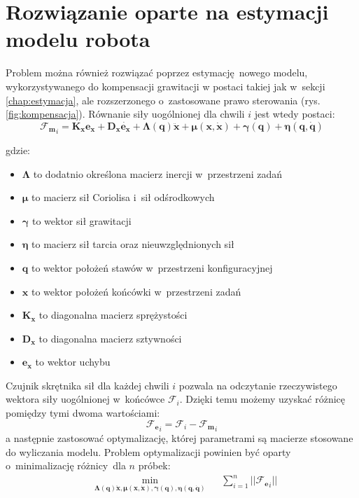 \section{Rozwiązanie oparte na estymacji modelu robota}
\label{chap:rozw_model}
Problem można również rozwiązać poprzez estymację nowego modelu, wykorzystywanego do kompensacji grawitacji w postaci takiej jak w~sekcji \ref{chap:estymacja}, ale rozszerzonego o~zastosowane prawo sterowania \cite{bib:rozw_opt1, bib:rozw_opt2} (rys. \ref{fig:kompensacja}). Równanie siły uogólnionej dla chwili $i$ jest wtedy postaci:
\begin{equation}
\boldsymbol{\mathcal{F}_{m}}_i = \boldsymbol{K_x}\boldsymbol{e_x} + \boldsymbol{D_x}\dot{\boldsymbol{e_x}} + \boldsymbol{\Lambda}(\boldsymbol{q})\boldsymbol{\ddot{x}} + \boldsymbol{\mu}(\boldsymbol{x}, \boldsymbol{\dot{x}}) + \boldsymbol{\gamma}(\boldsymbol{q}) + \boldsymbol{\eta}(\boldsymbol{q}, \boldsymbol{\dot{q}})
\end{equation}

gdzie: 

\begin{itemize}
	\item $\boldsymbol{\Lambda}$ to dodatnio określona macierz inercji w~przestrzeni zadań
	\item $\boldsymbol{\mu}$ to macierz sił Coriolisa i~sił odśrodkowych	
	\item $\boldsymbol{\gamma}$ to wektor sił grawitacji
	\item $\boldsymbol{\eta}$ to macierz sił tarcia oraz nieuwzględnionych sił
	\item $\boldsymbol{q}$ to wektor położeń stawów w~przestrzeni konfiguracyjnej
	\item $\boldsymbol{x}$ to wektor położeń końcówki w~przestrzeni zadań
	\item $\boldsymbol{K_x}$ to diagonalna macierz sprężystości
	\item $\boldsymbol{D_x}$ to diagonalna macierz sztywności
	\item $\boldsymbol{e_x}$ to wektor uchybu
\end{itemize} 


Czujnik skrętnika sił dla każdej chwili $i$ pozwala na odczytanie rzeczywistego wektora siły uogólnionej w~końcówce $\boldsymbol{\mathcal{F}}_i$. Dzięki temu możemy uzyskać różnicę pomiędzy tymi dwoma wartościami:
\begin{equation}
\boldsymbol{\mathcal{F}_{e}}_i = \boldsymbol{\mathcal{F}}_{i} - \boldsymbol{\mathcal{F}_{m}}_i
\end{equation}
a następnie zastosować optymalizację, której parametrami są macierze stosowane do wyliczania modelu. Problem optymalizacji powinien być oparty o~minimalizację różnicy dla $n$ próbek:
\begin{equation}
\begin{aligned}
& \underset{\boldsymbol{\Lambda}(\boldsymbol{q})\boldsymbol{\ddot{x}}, \boldsymbol{\mu}(\boldsymbol{x}, \boldsymbol{\dot{x}}), \boldsymbol{\gamma}(\boldsymbol{q}), \boldsymbol{\eta}(\boldsymbol{q}, \boldsymbol{\dot{q}})}{\text{min}}
& & \sum_{i = 1}^{n} || \boldsymbol{\mathcal{F}_{e}}_i ||
\end{aligned}
\end{equation}

